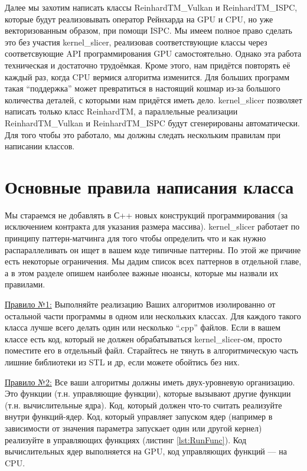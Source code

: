 \documentclass[11pt,fleqn,english,russian]{report} %
\begin{document}
Далее мы захотим написать классы ReinhardTM\_Vulkan и ReinhardTM\_ISPC, которые будут реализовывать оператор Рейнхарда на GPU и CPU, но уже векторизованным образом, при помощи ISPC. Мы имеем полное право сделать это без участия kernel\_slicer, реализовав соответствующие классы через соответсвующие API программирования GPU самостоятельно. Однако эта работа техническая и достаточно трудоёмкая. Кроме этого, нам придётся повторять её каждый раз, когда CPU вермися алгоритма изменится. Для больших программ такая ``поддержка'' может превратиться в настоящий кошмар из-за большого количества деталей, с которыми нам придётся иметь дело. kernel\_slicer позволяет написать только класс ReinhardTM, а параллельные реализации ReinhardTM\_Vulkan и ReinhardTM\_ISPC будут сгенерированы автоматически. Для того чтобы это работало, мы должны следать нескольким правилам при написании классов.

\section{Основные правила написания класса}

Мы стараемся не добавлять в С++ новых конструкций программирования (за исключением контракта для указания размера массива). kernel\_slicer работает по принципу паттерн-матчинга для того чтобы определить что и как нужно распараллеливать он ищет в вашем коде типичные паттерны. По этой же причине есть некоторые ограничения. Мы дадим список всех паттернов в отдельной главе, а в этом разделе опишем наиболее важные нюансы, которые мы назвали их правилами.

\underline{Правило №1:} Выполняйте реализацию Ваших алгоритмов изолированно от остальной части программы в одном или нескольких классах. Для каждого такого класса лучше всего делать один или несколько ``.cpp'' файлов. Если в вашем классе есть код, который не должен обрабатываться kernel\_slicer-ом, просто поместите его в отдельный файл. Старайтесь не тянуть в алгоритмическую часть лишние библиотеки из STL и др, если можете обойтись без них.

\underline{Правило №2:} Все ваши алгоритмы должны иметь двух-уровневую организацию. Это функции (т.н. управляющие функции), которые вызывают другие функции (т.н. вычислительные ядра). Код, который должен что-то считать реализуйте внутри функций-ядер. Код, который управляет запуском ядер (например в зависимости от значения параметра запускает один или другой кернел) реализуйте в управляющих функциях (листинг \ref{lst:RunFunc}). Код вычислительных ядер выполняется на GPU, код управляющих функций --- на CPU.
\end{document}
